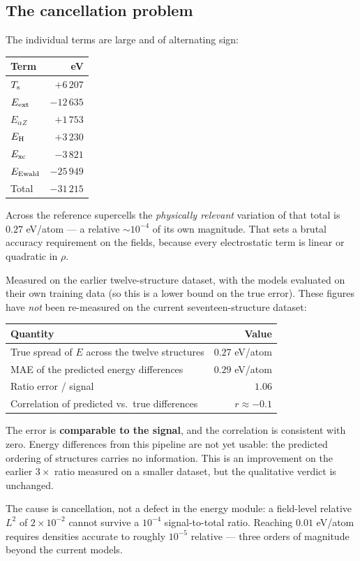 \subsection{The cancellation problem}

The individual terms are large and of alternating sign:

\begin{center}
\begin{tabular}{@{}lr@{}}
\toprule
Term & eV \\
\midrule
$T_{\mathrm{s}}$          & $+6\,207$ \\
$E_{\rm ext}$  & $-12\,635$ \\
$E_{\alpha Z}$ & $+1\,753$ \\
$E_{\rm H}$    & $+3\,230$ \\
$E_{\rm xc}$   & $-3\,821$ \\
$E_{\rm Ewald}$ & $-25\,949$ \\
\midrule
Total & $-31\,215$ \\
\bottomrule
\end{tabular}
\end{center}

Across the reference supercells the \emph{physically relevant} variation of
that total is $0.27$ eV/atom --- a relative $\sim10^{-4}$ of its own magnitude.
That sets a brutal accuracy requirement on the fields, because every
electrostatic term is linear or quadratic in $\rho$.

Measured on the earlier twelve-structure dataset, with the models evaluated on
their own training data (so this is a lower bound on the true error). These
figures have \emph{not} been re-measured on the current seventeen-structure
dataset:

\begin{center}
\begin{tabular}{@{}lr@{}}
\toprule
Quantity & Value \\
\midrule
True spread of $E$ across the twelve structures & $0.27$ eV/atom \\
MAE of the predicted energy differences & $0.29$ eV/atom \\
Ratio error / signal & $1.06$ \\
Correlation of predicted vs.\ true differences & $r \approx -0.1$ \\
\bottomrule
\end{tabular}
\end{center}

\begin{pwarn}
The error is \textbf{comparable to the signal}, and the correlation is
consistent with zero. Energy differences from this pipeline are not yet usable:
the predicted ordering of structures carries no information. This is an
improvement on the earlier $3\times$ ratio measured on a smaller dataset, but
the qualitative verdict is unchanged.

The cause is cancellation, not a defect in the energy module: a field-level
relative $L^{2}$ of $2\times10^{-2}$ cannot survive a $10^{-4}$
signal-to-total ratio. Reaching $0.01$ eV/atom requires densities accurate to
roughly $10^{-5}$ relative --- three orders of magnitude beyond the current
models.
\end{pwarn}

